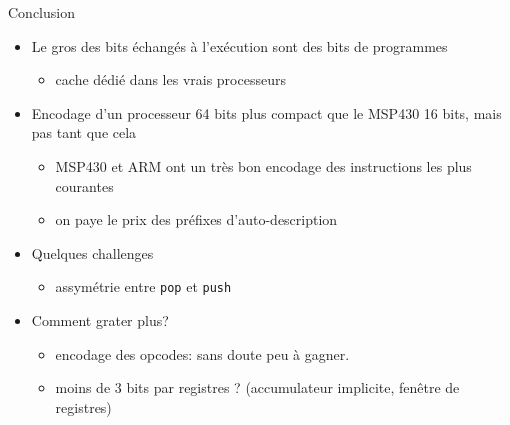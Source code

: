 \documentclass[slidetop,11pt,table]{beamer}
\begin{document}
\begin{frame}{Conclusion}
  \begin{itemize}
  \item Le gros des bits échangés à l'exécution sont des bits de programmes
    \begin{itemize}
    \item cache dédié dans les vrais processeurs
    \end{itemize}
  \item Encodage d'un processeur 64 bits plus compact que le MSP430 16 bits, mais pas tant que cela
    \begin{itemize}
    \item MSP430 et ARM ont un très bon encodage des instructions les plus courantes
    \item on paye le prix des préfixes d'auto-description
    \end{itemize}
  \item Quelques challenges
    \begin{itemize}
    \item assymétrie entre \texttt{pop} et \texttt{push}
    \end{itemize}
  \item Comment grater plus?
    \begin{itemize}
    \item encodage des opcodes: sans doute peu à gagner.
    \item moins de 3 bits par registres ? (accumulateur implicite, fenêtre de registres)
    \end{itemize}
  \end{itemize}

\end{frame}
\end{document}
